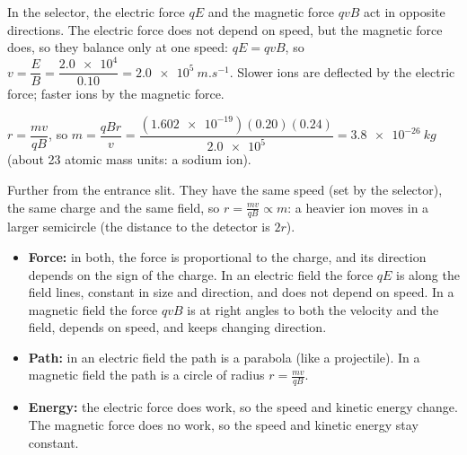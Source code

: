 \documentclass[12pt]{article}
\begin{document}
\ansq
{}
\begin{crit}
\end{crit}
\sample
In the selector, the electric force $qE$ and the magnetic force $qvB$ act in opposite directions. The
electric force does not depend on speed, but the magnetic force does, so they balance only at one
speed: $qE = qvB$, so $v = \dfrac{E}{B} = \dfrac{\num{2.0e4}}{0.10} = \qty{2.0e5}{m.s^{-1}}$. Slower ions
are deflected by the electric force; faster ions by the magnetic force.
\begin{crit}
\end{crit}
\sample
$r = \dfrac{mv}{qB}$, so $m = \dfrac{qBr}{v} = \dfrac{(\num{1.602e-19})(0.20)(0.24)}{\num{2.0e5}} =
\qty{3.8e-26}{kg}$ (about 23 atomic mass units: a sodium ion).
\begin{crit}
\end{crit}
\sample
Further from the entrance slit. They have the same speed (set by the selector), the same charge and the
same field, so $r = \frac{mv}{qB} \propto m$: a heavier ion moves in a larger semicircle (the distance to
the detector is $2r$).

\ansq
\begin{crit}
\end{crit}
\sample
\begin{itemize}
  \item \textbf{Force:} in both, the force is proportional to the charge, and its direction depends
        on the sign of the charge. In an electric field the force $qE$ is along the field lines, constant
        in size and direction, and does not depend on speed. In a magnetic field the force $qvB$ is at
        right angles to both the velocity and the field, depends on speed, and keeps changing direction.
  \item \textbf{Path:} in an electric field the path is a parabola (like a projectile). In a magnetic
        field the path is a circle of radius $r = \frac{mv}{qB}$.
  \item \textbf{Energy:} the electric force does work, so the speed and kinetic energy change. The
        magnetic force does no work, so the speed and kinetic energy stay constant.
\end{itemize}
\end{document}

